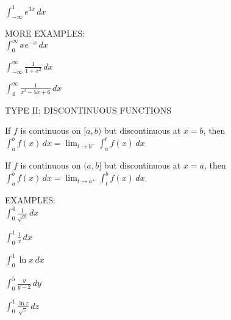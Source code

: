\documentclass[11pt]{article}
\begin{document}
$\int_{-\infty}^1 e^{3x} \, dx$

\vspace{2in}

MORE EXAMPLES:\\

$\int_0^{\infty}xe^{-x} \, dx$

\vspace{2.5in}


\pagebreak

$\int_{-\infty}^{\infty}\frac{1}{1+x^2} \, dx$

\vspace{3.5in}


$\int_4^{\infty}\frac{1}{x^2-5x+6} \, dx$

\pagebreak


TYPE II:  DISCONTINUOUS FUNCTIONS \\

\vspace{0.2in}

If $f$ is continuous on $[a,b)$ but discontinuous at $x=b$, then $\int_a^bf(x)\, dx = \lim_{t\to b^-} \int_a^tf(x)\, dx$. \\

  \vspace{1.1in}
  
  If $f$ is continuous on $(a,b]$ but discontinuous at $x=a$, then $\int_a^bf(x)\, dx = \lim_{t\to a^+} \int_t^bf(x)\, dx$. \\

  \vspace{0.5in}



EXAMPLES:\\

$\int_0^4 \frac{1}{\sqrt{x}} \, dx$

\vspace{2.5in}


$\int_0^1 \frac{1}{x} \, dx$


\vspace{2in}




\pagebreak

$\int_0^1 \ln{x} \, dx$

\vspace{2.5in}



$\int_0^5 \frac{y}{y-2} \, dy $

\vspace{4in}

$\int_0^1 \frac{\ln{z}}{\sqrt{z}} \, dz $
\pagebreak
\end{document}
